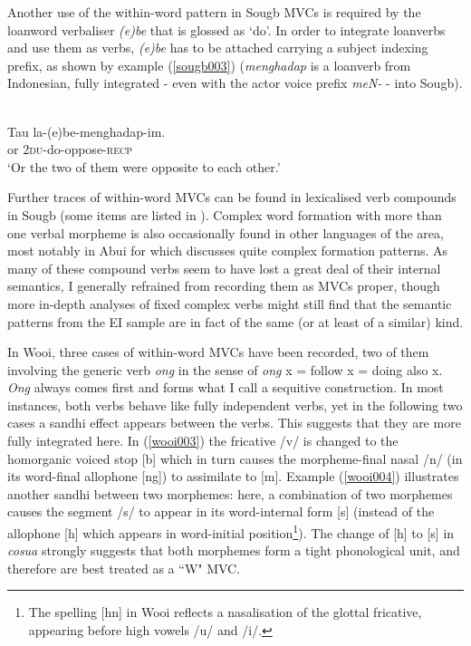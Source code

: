 Another use of the within-word pattern in Sougb MVCs is required by the loanword verbaliser \textit{(e)be} that is glossed as `do'. In order to integrate loanverbs and use them as verbs, \textit{(e)be} has to be attached carrying a subject indexing prefix, as shown by example (\ref{sougb003}) (\textit{menghadap} is a loanverb from Indonesian, fully integrated - even with the actor voice prefix \textit{meN-} - into Sougb).

\ea \label{sougb003}
\\
\gll Tau la-(e)be-menghadap-im. \\
or 2\textsc{du}-do-oppose-\textsc{recp} \\
\glft `Or the two of them were opposite to each other.'\\
\z

Further traces of within-word MVCs can be found in lexicalised verb compounds in Sougb (some items are listed in \citealt[216]{reesink2002grammar}). Complex word formation with more than one verbal morpheme is also occasionally found in other languages of the area, most notably in Abui for which \citet{kratochvil2007grammar} discusses quite complex formation patterns. As many of these compound verbs seem to have lost a great deal of their internal semantics, I generally refrained from recording them as MVCs proper, though more in-depth analyses of fixed complex verbs might still find that the semantic patterns from the EI sample are in fact of the same (or at least of a similar) kind.

In Wooi, three cases of within-word MVCs have been recorded, two of them involving the generic verb \textit{ong} in the sense of \textit{ong} x = follow x = doing also x. \textit{Ong} always comes first and forms what I call a sequitive construction. In most instances, both verbs behave like fully independent verbs, yet in the following two cases a sandhi effect appears between the verbs. This suggests that they are more fully integrated here. In (\ref{wooi003}) the fricative /v/ is changed to the homorganic voiced stop [b] which in turn causes the morpheme-final nasal /n/ (in its word-final allophone [ng]) to assimilate to [m]. Example (\ref{wooi004}) illustrates another sandhi between two morphemes: here, a combination of two morphemes causes the segment /s/ to appear in its word-internal form [s] (instead of the allophone [h] which appears in word-initial position\footnote{The spelling [hn] in Wooi reflects a nasalisation of the glottal fricative, appearing before high vowels /u/ and /i/.}). The change of [h] to [s] in \textit{cosua} strongly suggests that both morphemes form a tight phonological unit, and therefore are best treated as a ``W" MVC.

